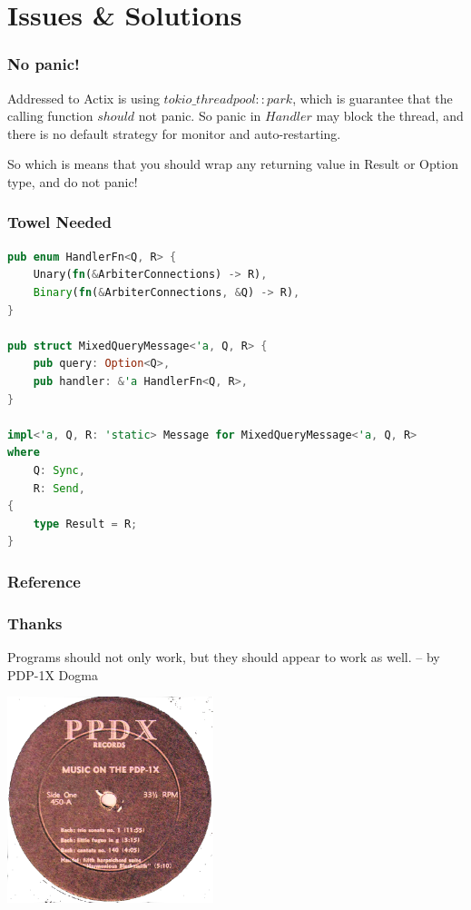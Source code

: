 \documentclass[notheorems, aspectratio=54]{beamer}
\begin{document}
\section{Issues \& Solutions}
\begin{frame}[fragile]
  \frametitle{No panic!}

  Addressed to Actix is using $tokio\_threadpool::park$, which is guarantee that the calling function $should$ not panic. So panic in $Handler$ may block the thread, and there is no default strategy for monitor and auto-restarting.

  So which is means that you should wrap any returning value in Result or Option type, and do not panic!
\end{frame}

\begin{frame}[fragile]
  \frametitle{Towel Needed}

\begin{lstlisting}[language=Rust]
pub enum HandlerFn<Q, R> {
    Unary(fn(&ArbiterConnections) -> R),
    Binary(fn(&ArbiterConnections, &Q) -> R),
}

pub struct MixedQueryMessage<'a, Q, R> {
    pub query: Option<Q>,
    pub handler: &'a HandlerFn<Q, R>,
}

impl<'a, Q, R: 'static> Message for MixedQueryMessage<'a, Q, R>
where
    Q: Sync,
    R: Send,
{
    type Result = R;
}
\end{lstlisting}

\end{frame}

\begin{frame}[allowframebreaks]
    \frametitle{Reference}
  
  
\end{frame}
\begin{frame}
  \frametitle{Thanks}
  \begin{center}
    Programs should not only work, but they should appear to work as well.
    -- by PDP-1X Dogma
  \end{center}
  \begin{center}
    \includegraphics[height=6cm]{./maxresdefault.png}
  \end{center}
\end{frame}
\end{document}
